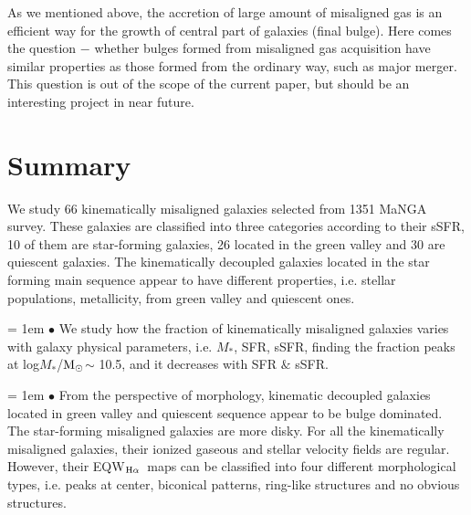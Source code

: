 \documentclass[a4paper,fleqn,usenatbib]{mnras}
\newcommand{\msun}{$\rm M_\odot$}
\newcommand{\mstar}{$M_*$}
\newcommand{\dindex}{D$_n$4000}
\newcommand{\ewhae}{\rm{EQW$_{\rm H\alpha}$}}
\begin{document}

As we mentioned above, the accretion of large amount of misaligned gas is an efficient way for the growth of central part of galaxies (final bulge). 
Here comes the question $-$ whether bulges formed from 
misaligned gas acquisition have similar properties as those formed from the ordinary way, 
such as major merger. This question is out of the scope of the current paper, but should be an interesting 
project in near future.

\section{Summary}\label{sec:summary}

We study 66 kinematically misaligned galaxies selected from 1351 MaNGA survey.
These galaxies are classified into three categories according to 
their sSFR, 10 of them are star-forming galaxies, 26 located in the green valley and 30 are 
quiescent galaxies. The kinematically decoupled galaxies located in the star forming main sequence 
appear to have different properties, i.e. stellar populations, metallicity, from green valley and quiescent ones.


\hangindent = 1em
\noindent$\bullet$ We study how the fraction of kinematically misaligned galaxies varies with galaxy 
physical parameters, i.e. \mstar, SFR, sSFR, finding the fraction peaks at log\mstar/\msun $\sim$ 10.5, and it decreases with SFR $\&$ sSFR.

\hangindent = 1em
\noindent$\bullet$ From the perspective of morphology, kinematic 
decoupled galaxies located in green valley and quiescent sequence appear to be bulge dominated. 
The star-forming misaligned galaxies are more disky. 
For all the kinematically misaligned galaxies, their ionized gaseous and stellar velocity fields are regular. 
However, their \ewhae\ maps can be classified into four different morphological types, i.e. peaks at center, 
biconical patterns, ring-like structures and no obvious structures.
\end{document}
